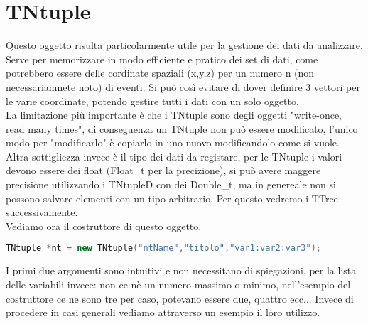 \section{TNtuple}
Questo oggetto risulta particolarmente utile per la gestione dei dati da analizzare. Serve per memorizzare in modo efficiente e pratico dei set di dati, come potrebbero essere delle cordinate spaziali (x,y,z) per un numero n (non necessariamnete noto) di eventi. Si può così evitare di dover definire 3 vettori per le varie coordinate, potendo gestire tutti i dati con un solo oggetto.\\
La limitazione più importante è che i TNtuple sono degli oggetti "write-once, read many times", di conseguenza un TNtuple non può essere modificato, l'unico modo per "modificarlo" è copiarlo in uno nuovo modificandolo come si vuole. Altra sottigliezza invece è il tipo dei dati da registare, per le TNtuple i valori devono essere dei float (Float\_t per la precizione), si può avere maggere precisione utilizzando i TNtupleD con dei Double\_t, ma in genereale non si possono salvare elementi con un tipo arbitrario. Per questo vedremo i TTree successivamente.\\
Vediamo ora il costruttore di questo oggetto.
\begin{lstlisting}[language=C++,label={cod1},mathescape=true,breaklines=true]
	TNtuple *nt = new TNtuple("ntName","titolo","var1:var2:var3");
\end{lstlisting}
I primi due argomenti sono intuitivi e non necessitano di spiegazioni, per la lista delle variabili invece: non ce nè un numero massimo o minimo, nell'esempio del costruttore ce ne sono tre per caso, potevano essere due, quattro ecc... Invece di procedere in casi generali vediamo attraverso un esempio il loro utilizzo.


